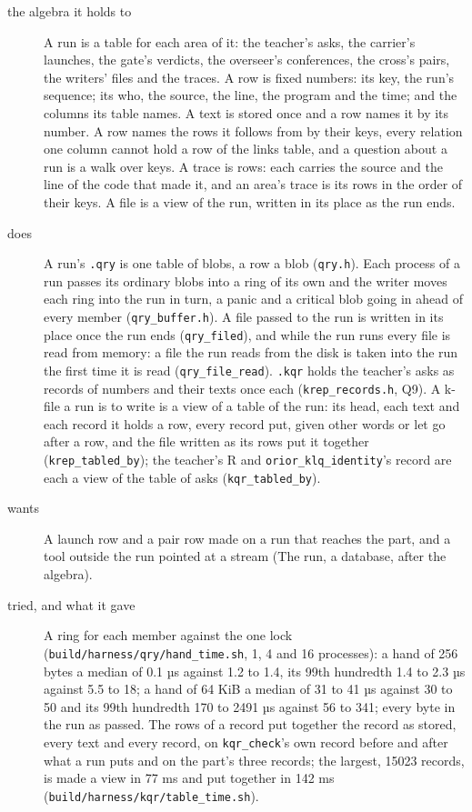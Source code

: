 \begin{description}
\item[{the algebra it holds to}] A run is a table for each area of it: the teacher's asks, the carrier's launches, the gate's verdicts, the overseer's conferences, the cross's pairs, the writers' files and the traces. A row is fixed numbers: its key, the run's sequence; its who, the source, the line, the program and the time; and the columns its table names. A text is stored once and a row names it by its number. A row names the rows it follows from by their keys, every relation one column cannot hold a row of the links table, and a question about a run is a walk over keys. A trace is rows: each carries the source and the line of the code that made it, and an area's trace is its rows in the order of their keys. A file is a view of the run, written in its place as the run ends.
\item[{does}] A run's \texttt{.\allowbreak{}qry} is one table of blobs, a row a blob (\texttt{qry.\allowbreak{}h}). Each process of a run passes its ordinary blobs into a ring of its own and the writer moves each ring into the run in turn, a panic and a critical blob going in ahead of every member (\texttt{qry\_\allowbreak{}buffer.\allowbreak{}h}). A file passed to the run is written in its place once the run ends (\texttt{qry\_\allowbreak{}filed}), and while the run runs every file is read from memory: a file the run reads from the disk is taken into the run the first time it is read (\texttt{qry\_\allowbreak{}file\_\allowbreak{}read}). \texttt{.\allowbreak{}kqr} holds the teacher's asks as records of numbers and their texts once each (\texttt{krep\_\allowbreak{}records.\allowbreak{}h}, Q9). A k-file a run is to write is a view of a table of the run: its head, each text and each record it holds a row, every record put, given other words or let go after a row, and the file written as its rows put it together (\texttt{krep\_\allowbreak{}tabled\_\allowbreak{}by}); the teacher's R and \texttt{orior\_\allowbreak{}klq\_\allowbreak{}identity}'s record are each a view of the table of asks (\texttt{kqr\_\allowbreak{}tabled\_\allowbreak{}by}).
\item[{wants}] A launch row and a pair row made on a run that reaches the part, and a tool outside the run pointed at a stream (The run, a database, after the algebra).
\item[{tried, and what it gave}] A ring for each member against the one lock (\texttt{build/\allowbreak{}harness/\allowbreak{}qry/\allowbreak{}hand\_\allowbreak{}time.\allowbreak{}sh}, 1, 4 and 16 processes): a hand of 256 bytes a median of 0.1 µs against 1.2 to 1.4, its 99th hundredth 1.4 to 2.3 µs against 5.5 to 18; a hand of 64 KiB a median of 31 to 41 µs against 30 to 50 and its 99th hundredth 170 to 2491 µs against 56 to 341; every byte in the run as passed. The rows of a record put together the record as stored, every text and every record, on \texttt{kqr\_\allowbreak{}check}'s own record before and after what a run puts and on the part's three records; the largest, 15023 records, is made a view in 77 ms and put together in 142 ms (\texttt{build/\allowbreak{}harness/\allowbreak{}kqr/\allowbreak{}table\_\allowbreak{}time.\allowbreak{}sh}).

\end{description}
